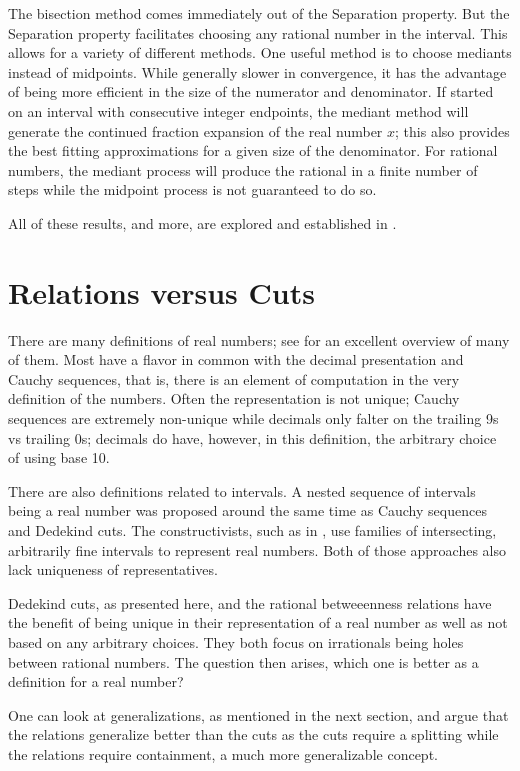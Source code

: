 \documentclass[12pt]{article}
\begin{document}
The bisection method comes immediately out of the Separation property. But the Separation property facilitates choosing any rational number in the interval. This allows for a variety of different methods. One useful method is to choose mediants instead of midpoints. While generally slower in convergence, it has the advantage of being more efficient in the size of the numerator and denominator. If started on an interval with consecutive integer endpoints, the mediant method will generate the continued fraction expansion of the real number $x$; this also provides the best fitting approximations for a given size of the denominator. For rational numbers, the mediant process will produce the rational in a finite number of steps while the midpoint process is not guaranteed to do so. 

All of these results, and more, are explored and established in \cite{taylor23main}.

\section{Relations versus Cuts}

There are many definitions of real numbers; see \cite{ittay-2015} for an excellent overview of many of them. Most have a flavor in common with the decimal presentation and Cauchy sequences, that is, there is an element of computation in the very definition of the numbers. Often the representation is not unique; Cauchy sequences are extremely non-unique while decimals only falter on the trailing 9s vs trailing 0s; decimals do have, however, in this definition, the arbitrary choice of using base 10. 

There are also definitions related to intervals. A nested sequence of intervals being a real number was proposed around the same time as Cauchy sequences and Dedekind cuts. The constructivists, such as in \cite{bridger}, use families of intersecting, arbitrarily fine intervals to represent real numbers. Both of those approaches also lack uniqueness of representatives. 

Dedekind cuts, as presented here, and the rational betweeenness relations have the benefit of being unique in their representation of a real number as well as not based on any arbitrary choices. They both focus on irrationals being holes between rational numbers. The question then arises, which one is better as a definition for a real number? 

One can look at generalizations, as mentioned in the next section, and argue that the relations generalize better than the cuts as the cuts require a splitting while the relations require containment, a much more generalizable concept. 
\end{document}

